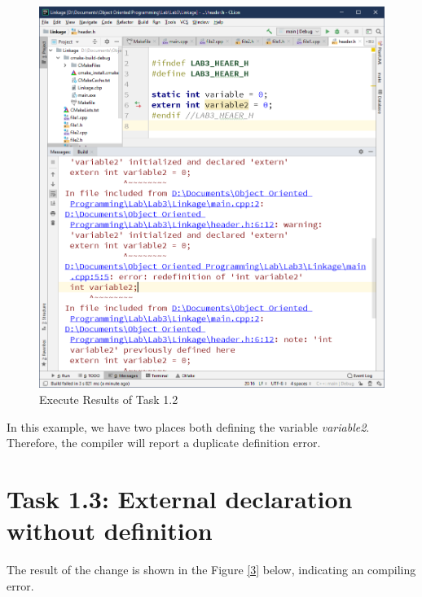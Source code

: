 \documentclass[a4paper]{report}
\begin{document}
\begin{figure}
  \centering
  \includegraphics[scale=0.5]{Onetow.PNG}
  \caption{Execute Results of Task 1.2}\label{2}
\end{figure}


In this example, we have two places both defining the variable \emph{variable2}. Therefore, the compiler will report a duplicate definition error.
\section{Task 1.3: External declaration without definition}

The result of the change is shown in the Figure \ref{3} below, indicating an compiling error.
\end{document}
